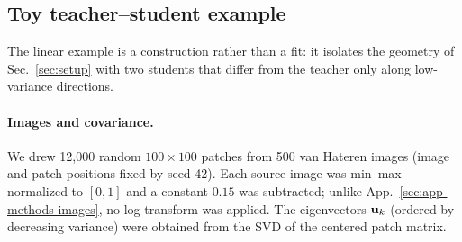 \subsection{Toy teacher--student example}
\label{sec:app-methods-toy}
The linear example is a construction rather than a fit: it isolates the
geometry of Sec.~\ref{sec:setup} with two students that differ from the
teacher only along low-variance directions.

\paragraph{Images and covariance.}
We drew 12,000 random $100\times100$ patches from 500 van Hateren images
(image and patch positions fixed by seed 42).  Each source image was min--max
normalized to $[0,1]$ and a constant $0.15$ was subtracted; unlike
App.~\ref{sec:app-methods-images}, no log transform was applied.  The
eigenvectors ${\mathbf{u}}_k$ (ordered by decreasing variance) were obtained from
the SVD of the centered patch matrix.

